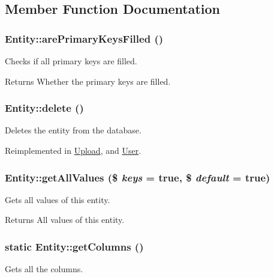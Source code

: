 \subsection{Member Function Documentation}
\hypertarget{classEntity_abb502198e82d7770d9ac677152a5b958}{
\subsubsection[{arePrimaryKeysFilled}]{\setlength{\rightskip}{0pt plus 5cm}Entity::arePrimaryKeysFilled ()}}
\label{classEntity_abb502198e82d7770d9ac677152a5b958}
Checks if all primary keys are filled.

\begin{DoxyReturn}{Returns}
Whether the primary keys are filled. 
\end{DoxyReturn}
\hypertarget{classEntity_a59eae3c476f3996973400a024097c87e}{
\subsubsection[{delete}]{\setlength{\rightskip}{0pt plus 5cm}Entity::delete ()}}
\label{classEntity_a59eae3c476f3996973400a024097c87e}
Deletes the entity from the database. 

Reimplemented in \hyperlink{classUpload_a5e10f0433b44a7e78f5c2232e3d71aa4}{Upload}, and \hyperlink{classUser_a87accb91013ff60d7ecdc1b1f6c02364}{User}.

\hypertarget{classEntity_a8ac249c9942d8c9d9886c3b08c2389e7}{
\subsubsection[{getAllValues}]{\setlength{\rightskip}{0pt plus 5cm}Entity::getAllValues (\$ {\em keys} = {\ttfamily true}, \/  \$ {\em default} = {\ttfamily true})}}
\label{classEntity_a8ac249c9942d8c9d9886c3b08c2389e7}
Gets all values of this entity.

\begin{DoxyReturn}{Returns}
All values of this entity. 
\end{DoxyReturn}
\hypertarget{classEntity_a394717a08ffd54ec9a14d06727c86719}{
\subsubsection[{getColumns}]{\setlength{\rightskip}{0pt plus 5cm}static Entity::getColumns ()}}
\label{classEntity_a394717a08ffd54ec9a14d06727c86719}
Gets all the columns.

